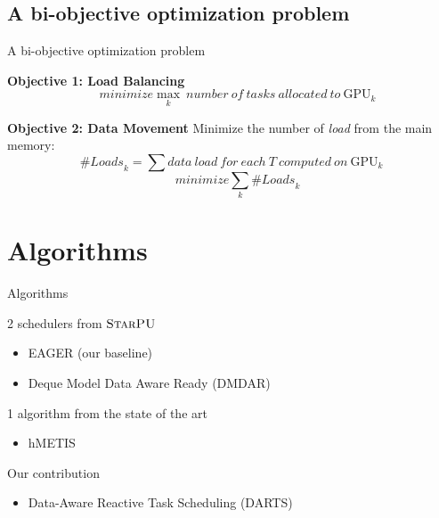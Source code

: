 \documentclass{libs/ufc_format}
\newcommand{\nbloads}{\ensuremath{\mathit{\mathit{\#Loads}}}\xspace}
\newcommand{\starpu}{\textsc{StarPU}\xspace}
\newcommand{\GPU}[1]{\ensuremath{\mathrm{GPU}_{#1}}\xspace}
\begin{document}
\subsection{A bi-objective optimization problem}
\begin{frame}{A bi-objective optimization problem}
\begin{block}{\bf Objective 1: Load Balancing}
  $$\quad \mathit{minimize} \max_{k}~number~of~tasks~allocated~to~\GPU{k}$$
\end{block}

\begin{block}{\bf Objective 2: Data Movement}
	Minimize the number of \emph{load} from the main memory:
$$
\nbloads_k =\sum data~load~for~each~T~computed~on~\GPU{k}
$$
  $$\quad  \mathit{minimize} \sum_k \nbloads_k$$
\end{block}


\end{frame}

\section{Algorithms}
\begin{frame}{Algorithms}
\begin{block}{2 schedulers from $\starpu$}
	\begin{itemize}
		\item EAGER (our baseline)
		\item Deque Model Data Aware Ready (DMDAR)
	\end{itemize}
\end{block}
\begin{block}{1 algorithm from the state of the art}
	\begin{itemize}
		\item hMETIS
	\end{itemize}
\end{block}
\begin{block}{Our contribution}
	\begin{itemize}
		\item Data-Aware Reactive Task Scheduling (DARTS)
	\end{itemize}
\end{block}
\end{frame}
\end{document}

